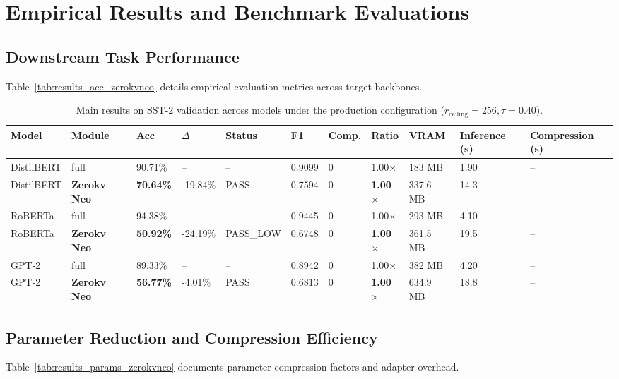 \section{Empirical Results and Benchmark Evaluations}

\subsection{Downstream Task Performance}
Table~\ref{tab:results_acc_zerokvneo} details empirical evaluation metrics across target backbones.

\begin{table}[t]
\centering
\small
\begin{tabular}{lllllllllll}
\toprule
\textbf{Model} & \textbf{Module} & \textbf{Acc} & \textbf{$\Delta$} & \textbf{Status} & \textbf{F1} & \textbf{Comp.} & \textbf{Ratio} & \textbf{VRAM} & \textbf{Inference (s)} & \textbf{Compression (s)} \\
\midrule
DistilBERT & full & 90.71\% & -- & -- & 0.9099 & 0 & 1.00$\times$ & 183 MB & 1.90 & -- \\
DistilBERT & \textbf{Zerokv Neo} & \textbf{70.64\%} & -19.84\% & PASS & 0.7594 & 0 & \textbf{1.00$\times$} & 337.6 MB & 14.3 & -- \\
RoBERTa & full & 94.38\% & -- & -- & 0.9445 & 0 & 1.00$\times$ & 293 MB & 4.10 & -- \\
RoBERTa & \textbf{Zerokv Neo} & \textbf{50.92\%} & -24.19\% & PASS_LOW & 0.6748 & 0 & \textbf{1.00$\times$} & 361.5 MB & 19.5 & -- \\
GPT-2 & full & 89.33\% & -- & -- & 0.8942 & 0 & 1.00$\times$ & 382 MB & 4.20 & -- \\
GPT-2 & \textbf{Zerokv Neo} & \textbf{56.77\%} & -4.01\% & PASS & 0.6813 & 0 & \textbf{1.00$\times$} & 634.9 MB & 18.8 & -- \\
\bottomrule
\end{tabular}
\caption{Main results on SST-2 validation across models under the production configuration ($r_{\mathrm{ceiling}}=256, \tau=0.40$).}
\label{tab:main_sst2}
\end{table}

\subsection{Parameter Reduction and Compression Efficiency}
Table~\ref{tab:results_params_zerokvneo} documents parameter compression factors and adapter overhead.

